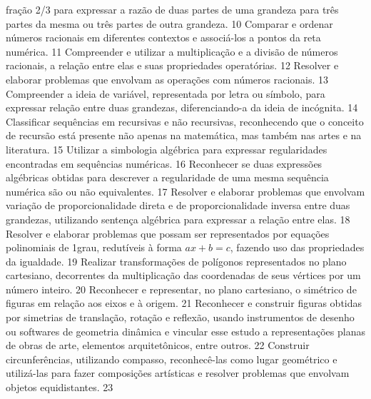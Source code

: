 {{{{{							fração 2/3 para expressar a razão de duas partes de uma grandeza para três partes da mesma
							ou três partes de outra grandeza.
						}
						{10}{%
							Comparar e ordenar números racionais em diferentes contextos e associá-los a
							pontos da reta numérica.
						}
						{11}{%
							Compreender e utilizar a multiplicação e a divisão de números racionais, a relação
							entre elas e suas propriedades operatórias.
						}
						{12}{%
							Resolver e elaborar problemas que envolvam as operações com números racionais.
						}
						{13}{%
							Compreender a ideia de variável, representada por letra ou símbolo, para expressar
							relação entre duas grandezas, diferenciando-a da ideia de incógnita.
						}
						{14}{%
							Classificar sequências em recursivas e não recursivas, reconhecendo que o
							conceito de recursão está presente não apenas na matemática, mas também nas artes e na
							literatura.
						}
						{15}{%
							Utilizar a simbologia algébrica para expressar regularidades encontradas em
							sequências numéricas.
						}
						{16}{%
							Reconhecer se duas expressões algébricas obtidas para descrever a regularidade
							de uma mesma sequência numérica são ou não equivalentes.
						}
						{17}{%
							Resolver e elaborar problemas que envolvam variação de proporcionalidade
							direta e de proporcionalidade inversa entre duas grandezas, utilizando sentença algébrica para
							expressar a relação entre elas.
						}
						{18}{%
							Resolver e elaborar problemas que possam ser representados por equações
							polinomiais de 1\textordmasculine grau, redutíveis à forma \(ax + b = c\), fazendo uso das propriedades da igualdade.
						}
						{19}{%
							Realizar transformações de polígonos representados no plano cartesiano,
							decorrentes da multiplicação das coordenadas de seus vértices por um número inteiro.
						}
						{20}{%
							Reconhecer e representar, no plano cartesiano, o simétrico de figuras em relação
							aos eixos e à origem.
						}
						{21}{%
							Reconhecer e construir figuras obtidas por simetrias de translação, rotação e reflexão,
							usando instrumentos de desenho ou softwares de geometria dinâmica e vincular esse estudo a
							representações planas de obras de arte, elementos arquitetônicos, entre outros.
						}
						{22}{%
							Construir circunferências, utilizando compasso, reconhecê-las como lugar
							geométrico e utilizá-las para fazer composições artísticas e resolver problemas que envolvam
							objetos equidistantes.
						}
						{23}{%
}}}}}
